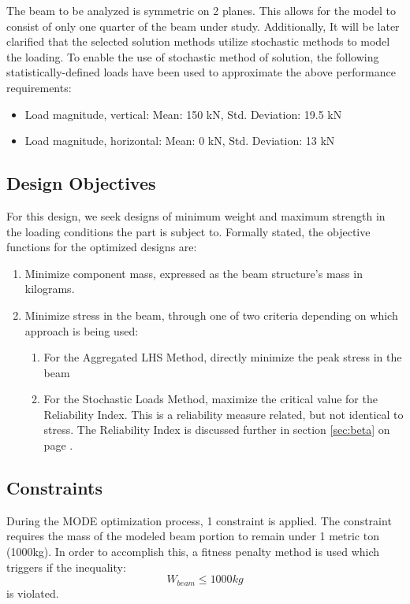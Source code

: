 The beam to be analyzed is symmetric on 2 planes. This allows for the model to consist of only one quarter of the beam under study. Additionally, It will be later clarified that the selected solution methods utilize stochastic methods to model the loading. To enable the use of stochastic method of solution, the following statistically-defined loads have been used to approximate the above performance requirements: 

\begin{itemize}
\item Load magnitude, vertical:   Mean: 150 kN, Std. Deviation: 19.5 kN
\item Load magnitude, horizontal: Mean: 0   kN, Std. Deviation: 13 kN
\end{itemize}

\subsection{Design Objectives}
For this design, we seek designs of minimum weight and maximum strength in the loading conditions the part is subject to. Formally stated, the objective functions for the optimized designs are: 

\begin{enumerate}
\item Minimize component mass, expressed as the beam structure's mass in kilograms. 
\item Minimize stress in the beam, through one of two criteria depending on which approach is being used: 
	\begin{enumerate}
	    \item For the Aggregated LHS Method, directly minimize the peak stress in the beam
	    \item For the Stochastic Loads Method, maximize the critical value for the Reliability Index. This is a reliability measure related, but not identical to stress. The Reliability Index is discussed further in section \ref{sec:beta} on page \pageref{sec:beta}.
	\end{enumerate}
\end{enumerate}

\subsection{Constraints}
During the MODE optimization process, 1 constraint is applied. The constraint requires the mass of the modeled beam portion to remain under 1 metric ton (1000kg). In order to accomplish this, a fitness penalty method is used which triggers if the inequality:
$$
W_{beam} \leq 1000kg
$$
is violated. 

